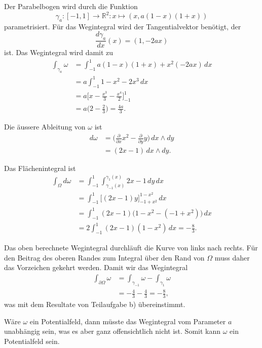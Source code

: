 \begin{loesung}
Der Parabelbogen wird durch die Funktion
\[
\gamma_a
\colon
[-1,1]\to\mathbb{R}^2
:
x\mapsto (x,a(1-x)(1+x))
\]
parametrisiert.
Für das Wegintegral wird der Tangentialvektor benötigt, der
\[
\frac{d\gamma_a}{dx}(x)
=
(1,-2ax)
\]
ist.
Das Wegintegral wird damit zu
\begin{align*}
\int_{\gamma_a} \omega
&=
\int_{-1}^1 a(1-x)(1+x) + x^2 (-2ax) \,dx
\\
&=
a\int_{-1}^1 1-x^2-2x^3\,dx
\\
&=
a
\biggl[
x-\frac{x^3}{3}-\frac{x^4}{2}
\biggr]_{-1}^1
\\
&=
a\biggl(
2-\frac23
\biggr)
=
\frac{4a}{3}.
\end{align*}
\begin{teilaufgaben}
\item
Die äussere Ableitung von $\omega$ ist
\begin{align*}
d\omega
&=
\biggl(
\frac{\partial}{\partial x}x^2
-
\frac{\partial}{\partial y}y
\biggr)\,dx\wedge dy
\\
&=
(2x-1)
\,dx\wedge dy.
\end{align*}
\item
Das Flächenintegral ist
\begin{align*}
\int_{\Omega}
d\omega
&=
\int_{-1}^1
\int_{\gamma_{-1}(x)}^{\gamma_1(x)}
2x-1
\,dy
\,dx
\\
&=
\int_{-1}^1
\biggl[(2x-1)y\biggr]_{-1+x^2}^{1-x^2}
\,dx
\\
&=
\int_{-1}^1
(2x-1)
\bigl(
1-x^2-(-1+x^2)
\bigr)
\,dx
\\
&=
2
\int_{-1}^1
(2x-1)
(1-x^2)
\,dx
=
-\frac{8}{3}.
\end{align*}
\item
Das oben berechnete Wegintegral durchläuft die Kurve von links nach
rechts.
Für den Beitrag des oberen Randes zum Integral über den Rand von
$\Omega$ muss daher das Vorzeichen gekehrt werden.
Damit wir das Wegintegral
\begin{align*}
\int_{\partial\Omega} \omega
&=
\int_{\gamma_{-1}}\omega - \int_{\gamma_{1}}\omega
\\
&=
-\frac{4}{3}-\frac{4}{3}
=
-\frac{8}3,
\end{align*}
was mit dem Resultate von Teilaufgabe b) übereinstimmt.
\item
Wäre $\omega$ ein Potentialfeld, dann müsste das Wegintegral vom Parameter
$a$ unabhängig sein, was es aber ganz offensichtlich nicht ist.
Somit kann $\omega$ ein Potentialfeld sein.
\end{teilaufgaben}
\end{loesung}

